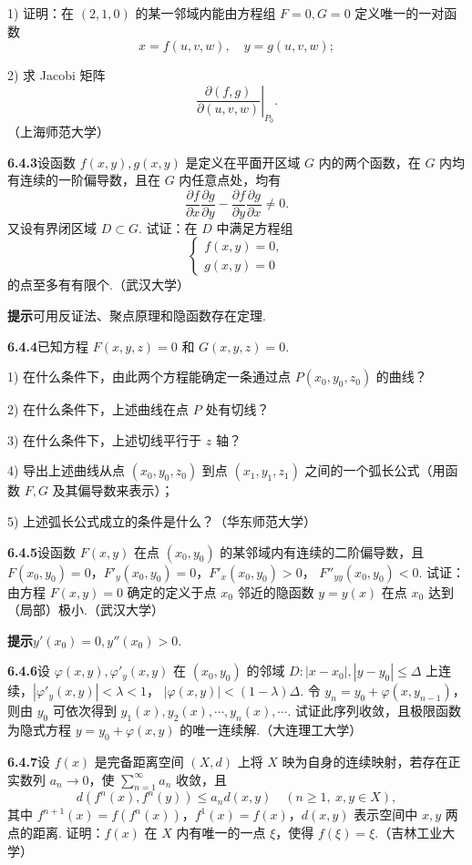 \documentclass[UTF8,12pt,a4paper,fontset=fandol]{ctexart}
\begin{document}
1) 证明：在 $(2,1,0)$ 的某一邻域内能由方程组 $F=0,G=0$ 定义唯一的一对函数
\[
  x=f(u,v,w),\quad y=g(u,v,w);
\]

2) 求 Jacobi 矩阵
\[
  \left.\frac{\partial(f,g)}{\partial(u,v,w)}\right|_{P_0}.
\]
（上海师范大学）

\noindent\textbf{6.4.3}\quad 设函数 $f(x,y),g(x,y)$ 是定义在平面开区域 $G$ 内的两个函数，在 $G$ 内均有连续的一阶偏导数，且在 $G$ 内任意点处，均有
\[
  \frac{\partial f}{\partial x}\frac{\partial g}{\partial y}
  -
  \frac{\partial f}{\partial y}\frac{\partial g}{\partial x}
  \ne0.
\]
又设有界闭区域 $D\subset G$. 试证：在 $D$ 中满足方程组
\[
\begin{cases}
  f(x,y)=0,\\
  g(x,y)=0
\end{cases}
\]
的点至多有有限个.（武汉大学）

\noindent\textbf{提示}\quad 可用反证法、聚点原理和隐函数存在定理.

\noindent\textbf{6.4.4}\quad 已知方程 $F(x,y,z)=0$ 和 $G(x,y,z)=0$.

1) 在什么条件下，由此两个方程能确定一条通过点 $P(x_0,y_0,z_0)$ 的曲线？

2) 在什么条件下，上述曲线在点 $P$ 处有切线？

3) 在什么条件下，上述切线平行于 $z$ 轴？

4) 导出上述曲线从点 $(x_0,y_0,z_0)$ 到点 $(x_1,y_1,z_1)$ 之间的一个弧长公式（用函数 $F,G$ 及其偏导数来表示）；

5) 上述弧长公式成立的条件是什么？（华东师范大学）

\noindent\textbf{6.4.5}\quad 设函数 $F(x,y)$ 在点 $(x_0,y_0)$ 的某邻域内有连续的二阶偏导数，且
$F(x_0,y_0)=0$，$F'_y(x_0,y_0)=0$，$F'_x(x_0,y_0)>0$，
$F''_{yy}(x_0,y_0)<0$. 试证：由方程 $F(x,y)=0$ 确定的定义于点 $x_0$ 邻近的隐函数
$y=y(x)$ 在点 $x_0$ 达到（局部）极小.（武汉大学）

\noindent\textbf{提示}\quad $y'(x_0)=0,y''(x_0)>0$.

\noindent\textbf{6.4.6}\quad 设 $\varphi(x,y),\varphi'_y(x,y)$ 在 $(x_0,y_0)$ 的邻域
$D: |x-x_0|, |y-y_0|\le\Delta$ 上连续，$|\varphi'_y(x,y)|<\lambda<1$，
$|\varphi(x,y)|<(1-\lambda)\Delta$. 令
$y_n=y_0+\varphi(x,y_{n-1})$，则由 $y_0$ 可依次得到
$y_1(x),y_2(x),\cdots,y_n(x),\cdots$. 试证此序列收敛，且极限函数为隐式方程
$y=y_0+\varphi(x,y)$ 的唯一连续解.（大连理工大学）

\noindent\textbf{6.4.7}\quad 设 $f(x)$ 是完备距离空间 $(X,d)$ 上将 $X$ 映为自身的连续映射，若存在正实数列 $a_n\to0$，使
$\sum_{n=1}^\infty a_n$ 收敛，且
\[
  d(f^n(x),f^n(y))\le a_n d(x,y)\quad(n\ge1,\ x,y\in X),
\]
其中 $f^{n+1}(x)=f(f^n(x))$，$f^1(x)=f(x)$，$d(x,y)$ 表示空间中 $x,y$ 两点的距离. 证明：$f(x)$ 在 $X$ 内有唯一的一点 $\xi$，使得 $f(\xi)=\xi$.（吉林工业大学）
\end{document}
